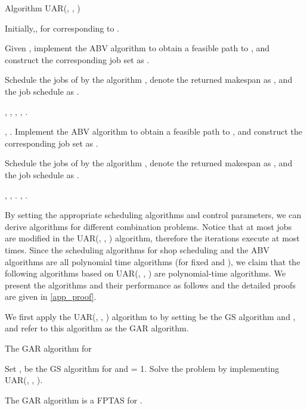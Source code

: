 \documentclass{llncs}
\numberwithin{subcase}{case}
\begin{document}
\begin{algorithm}[htb]
\caption{Algorithm UAR(, , )}
\label{alg_uar}
\begin{algorithmic}[1]
\STATE Initially,, for  corresponding to .

\STATE Given , implement the ABV algorithm to obtain a feasible path  to , and construct the corresponding job set as .

\STATE Schedule the jobs of  by the algorithm , denote the returned makespan as , and the job schedule as .

\STATE , , , , .

        \STATE , .
    \ENDFOR
    \STATE Implement the ABV algorithm to obtain a feasible path  to , and construct the corresponding job set as .

    \STATE Schedule the jobs of  by the algorithm , denote the returned makespan as , and the job schedule as .

    \IF{}
        \STATE , , .
    \ENDIF
\ENDWHILE
\RETURN ,  \AND .
\end{algorithmic}
\end{algorithm}

By setting the appropriate scheduling algorithms and control parameters, we can derive algorithms for different combination problems. Notice that at most  jobs are modified in the UAR(, , ) algorithm, therefore the iterations execute at most  times. Since the scheduling algorithms for shop scheduling and the ABV algorithms are all polynomial time algorithms (for fixed  and ), we claim that the following algorithms based on UAR(, , ) are polynomial-time algorithms. We present the algorithms and their performance as follows and the detailed proofs are given in \ref{app_proof}.

We first apply the UAR(, , ) algorithm to  by setting  be the GS algorithm and , and refer to this algorithm as the GAR algorithm.

\begin{algorithm}[htb]
\caption{The GAR algorithm for }
\label{alg_gar}
\begin{algorithmic}[1]
\STATE Set ,  be the GS algorithm for  and  = 1.
\STATE Solve the problem by implementing UAR(, , ).
\end{algorithmic}
\end{algorithm}

\begin{theorem}
The GAR algorithm is a FPTAS for .  \label{th_GAR}
\end{theorem}
\end{document}
